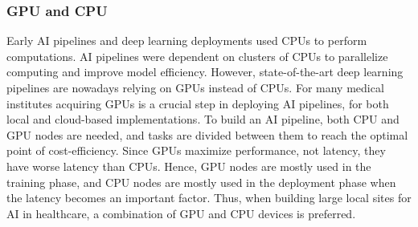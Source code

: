 \subsubsection{GPU and CPU}
Early AI pipelines and deep learning deployments used CPUs to perform computations. AI pipelines were dependent on clusters of CPUs to parallelize computing and improve model efficiency. However, state-of-the-art deep learning pipelines are nowadays relying on GPUs instead of CPUs. For many medical institutes acquiring GPUs is a crucial step in deploying AI pipelines, for both local and cloud-based implementations.
To build an AI pipeline, both CPU and GPU nodes are needed, and tasks are divided between them to reach the optimal point of cost-efficiency. Since GPUs maximize performance, not latency, they have worse latency than CPUs. Hence, GPU nodes are mostly used in the training phase, and CPU nodes are mostly used in the deployment phase when the latency becomes an important factor. Thus, when building large local sites for AI in healthcare, a combination of GPU and CPU devices is preferred. 
